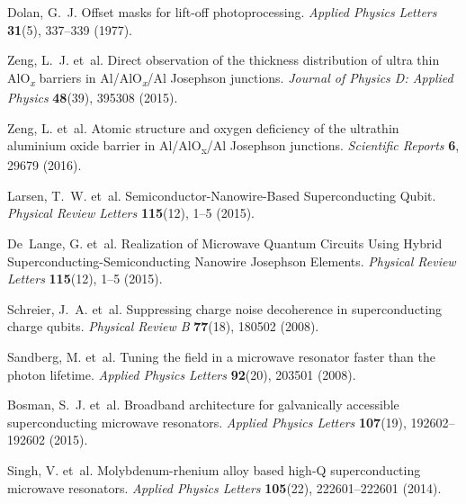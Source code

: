 \documentclass[preprint,
  onecolumn,
  notitlepage,
  amsmath,amssymb,
  aip,
  apl,
]{revtex4-1}
\begin{document}
\begin{thebibliography}{10}
	Dolan, G.~J.
	\newblock Offset masks for lift-off photoprocessing.
	\newblock \emph{Applied Physics Letters} \textbf{31}(5), 337--339 (1977).
	
	Zeng, L.~J. et~al.
	\newblock Direct observation of the thickness distribution of ultra thin
	{{AlO}\textsubscript{\emph{x}}} barriers in {Al}/{AlO}\textsubscript{\emph{x}}/{Al} Josephson junctions.
	\newblock \emph{Journal of Physics D: Applied Physics} \textbf{48}(39), 395308
	(2015).
	
	Zeng, L. et~al.
	\newblock Atomic structure and oxygen deficiency of the ultrathin aluminium
	oxide barrier in {{Al}}/{{AlO}}{\textsubscript{x}}/{{Al Josephson}}
	junctions.
	\newblock \emph{Scientific Reports} \textbf{6}, 29679 (2016).
	
	Larsen, T.~W. et~al.
	\newblock Semiconductor-{{Nanowire}}-{{Based Superconducting Qubit}}.
	\newblock \emph{Physical Review Letters} \textbf{115}(12), 1--5 (2015).
	
	De~Lange, G. et~al.
	\newblock Realization of {{Microwave Quantum Circuits Using Hybrid
			Superconducting}}-{{Semiconducting Nanowire Josephson Elements}}.
	\newblock \emph{Physical Review Letters} \textbf{115}(12), 1--5 (2015).
	
	Schreier, J.~A. et~al.
	\newblock Suppressing charge noise decoherence in superconducting charge
	qubits.
	\newblock \emph{Physical Review B} \textbf{77}(18), 180502 (2008).
	
	Sandberg, M. et~al.
	\newblock Tuning the field in a microwave resonator faster than the photon
	lifetime.
	\newblock \emph{Applied Physics Letters} \textbf{92}(20), 203501 (2008).
	
	Bosman, S.~J. et~al.
	\newblock Broadband architecture for galvanically accessible superconducting
	microwave resonators.
	\newblock \emph{Applied Physics Letters} \textbf{107}(19), 192602--192602
	(2015).
	
	Singh, V. et~al.
	\newblock Molybdenum-rhenium alloy based high-{{Q}} superconducting microwave
	resonators.
	\newblock \emph{Applied Physics Letters} \textbf{105}(22), 222601--222601
	(2014).
	

\end{thebibliography}
\end{document}
